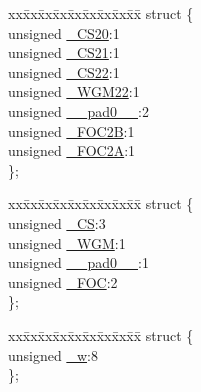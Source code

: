 \begin{DoxyCompactItemize}
\item 
\begin{tabbing}
xx\=xx\=xx\=xx\=xx\=xx\=xx\=xx\=xx\=\kill
struct \{\\
\>unsigned \hyperlink{union_____t_c_c_r2_bbits__t_ab552443787f80816a5025b21f18f0937}{\_CS20}:1\\
\>unsigned \hyperlink{union_____t_c_c_r2_bbits__t_a11258fc5a276e9cfbf103e0f4cde2173}{\_CS21}:1\\
\>unsigned \hyperlink{union_____t_c_c_r2_bbits__t_a5c1467b998a4177faf540f762b4ce85d}{\_CS22}:1\\
\>unsigned \hyperlink{union_____t_c_c_r2_bbits__t_a45580ae5e09200c47b31181f1b7e0b6d}{\_WGM22}:1\\
\>unsigned \hyperlink{union_____t_c_c_r2_bbits__t_ac6f2c180e18327465bc76f6f9753d84e}{\_\_pad0\_\_}:2\\
\>unsigned \hyperlink{union_____t_c_c_r2_bbits__t_a1a06ce35b94e3328e8f67b74a4047b37}{\_FOC2B}:1\\
\>unsigned \hyperlink{union_____t_c_c_r2_bbits__t_af7109837ddbfc710790c414e5afd9b6c}{\_FOC2A}:1\\
\}; \\

\end{tabbing}\item 
\begin{tabbing}
xx\=xx\=xx\=xx\=xx\=xx\=xx\=xx\=xx\=\kill
struct \{\\
\>unsigned \hyperlink{union_____t_c_c_r2_bbits__t_a0ef8303cc8da1636bf4555ae35d87bd4}{\_CS}:3\\
\>unsigned \hyperlink{union_____t_c_c_r2_bbits__t_ab6fd78f1ec97904d5a295779685c6bd9}{\_WGM}:1\\
\>unsigned \hyperlink{union_____t_c_c_r2_bbits__t_ac6f2c180e18327465bc76f6f9753d84e}{\_\_pad0\_\_}:1\\
\>unsigned \hyperlink{union_____t_c_c_r2_bbits__t_af5976c1288dee456474c9e21b9280f0f}{\_FOC}:2\\
\}; \\

\end{tabbing}\item 
\begin{tabbing}
xx\=xx\=xx\=xx\=xx\=xx\=xx\=xx\=xx\=\kill
struct \{\\
\>unsigned \hyperlink{union_____t_c_c_r2_bbits__t_a3644b0ebb2a536b718e9eda6ff22527e}{\_w}:8\\
\}; \\

\end{tabbing}\end{DoxyCompactItemize}


